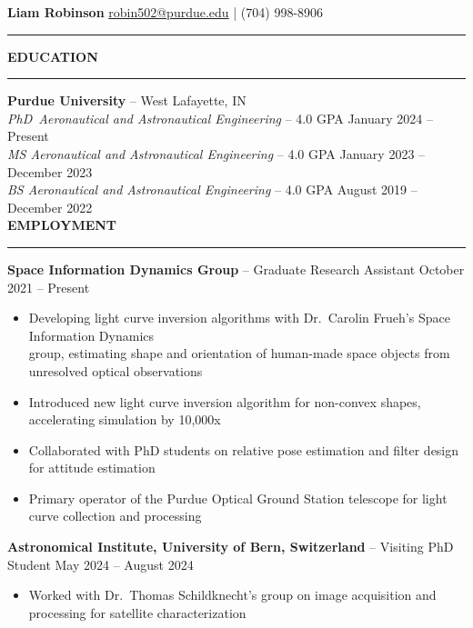 \documentclass[10pt, a4paper]{article}
\newcommand{\sectiontitle}[1]{{\Large \textbf{#1}}\vspace{0.5em}\hrule\vspace{0.5em}}
\begin{document}
\thispagestyle{empty}

\sffamily
\renewcommand*{\bibfont}{\normalfont\normalsize\sffamily}

\noindent
\textbf{\huge Liam Robinson} \hfill \href{mailto:robin502@purdue.edu}{robin502@purdue.edu} | (704) 998-8906
\rule{\linewidth}{4pt}
\vspace{-0.5em}

\sectiontitle{EDUCATION}
\textbf{Purdue University} -- West Lafayette, IN \\
\textit{PhD\ Aeronautical and Astronautical Engineering} -- 4.0 GPA \hfill January 2024 -- Present \\
\textit{MS \hspace{1px} Aeronautical and Astronautical Engineering} -- 4.0 GPA \hfill January 2023 -- December 2023 \\
\textit{BS \hspace{3px} Aeronautical and Astronautical Engineering} -- 4.0 GPA \hfill August 2019 -- December 2022 \\

\sectiontitle{EMPLOYMENT}
\textbf{Space Information Dynamics Group} -- Graduate Research Assistant \hfill October 2021 -- Present
\begin{itemize}[noitemsep]
    \item Developing light curve inversion algorithms with Dr.\ Carolin Frueh's Space Information Dynamics \\group, estimating shape and orientation of human-made space objects from unresolved optical observations
    \item Introduced new light curve inversion algorithm for non-convex shapes, accelerating simulation by 10,000x
    \item Collaborated with PhD students on relative pose estimation and filter design for attitude estimation
    \item Primary operator of the Purdue Optical Ground Station telescope for light curve collection and processing
\end{itemize}

\textbf{Astronomical Institute, University of Bern, Switzerland} -- Visiting PhD Student \hfill May 2024 -- August 2024
\begin{itemize}[noitemsep]
    \item Worked with Dr.\ Thomas Schildknecht's group on image acquisition and processing for satellite characterization
\end{itemize}
\end{document}
